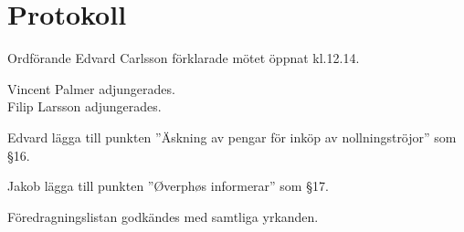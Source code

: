 \documentclass[10pt]{article}
\def\mo{Edvard Carlsson}
\begin{document}
\section*{Protokoll}
\begin{paragrafer}
Ordförande {\mo} förklarade mötet öppnat kl.12.14.

{\valavmo}

{\valavms}

{\valavj}

{\tosg}

Vincent Palmer adjungerades.\\
Filip Larsson adjungerades. 




Edvard \ypa lägga till punkten ''Äskning av pengar för inköp av nollningströjor'' som \S16.

Jakob \ypa lägga till punkten ''Øverphøs informerar'' som \S17.

Föredragningslistan godkändes med samtliga yrkanden.


\textit{\ingaprot}

\begin{fyllnadsval} %


\end{fyllnadsval}
\end{paragrafer}
\end{document}
